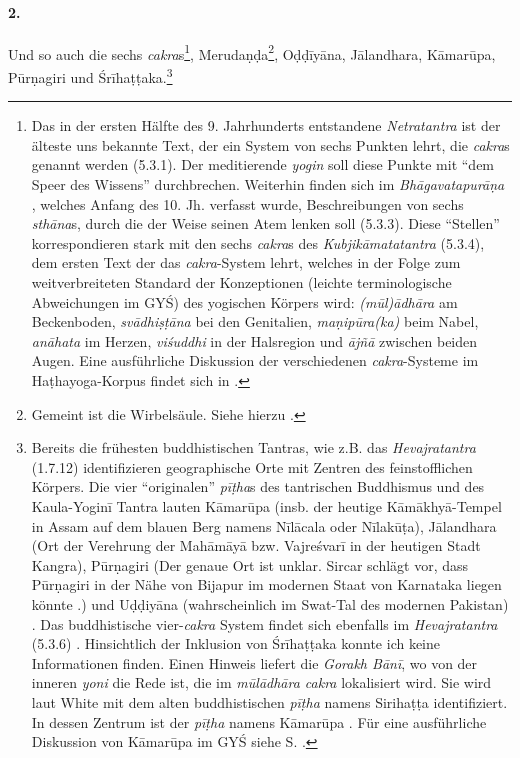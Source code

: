\documentclass[a4paper,12pt]{article}
\begin{document}
\label{cakras}
\paragraph{2.} Und so auch die sechs \textit{cakra}s\footnote{Das in der ersten Hälfte des 9. Jahrhunderts entstandene \textit{Netratantra} \parencite{netratantra} ist der älteste uns bekannte Text, der ein System von sechs Punkten lehrt, die \textit{cakra}s genannt werden (5.3.1). Der meditierende \textit{yogin} soll diese Punkte mit ``dem Speer des Wissens'' durchbrechen. Weiterhin finden sich im \textit{Bhāgavatapurāṇa} \parencite{bhagavata}, welches Anfang des 10. Jh. verfasst wurde, Beschreibungen von sechs \textit{sthāna}s, durch die der Weise seinen Atem lenken soll (5.3.3). Diese ``Stellen'' korrespondieren stark mit den sechs \textit{cakra}s des \textit{Kubjikāmatatantra} (5.3.4), dem ersten Text der das \textit{cakra}-System lehrt, welches in der Folge zum weitverbreiteten Standard der Konzeptionen (leichte terminologische Abweichungen im GYŚ) des yogischen Körpers wird: \textit{(mūl)ādhāra} am Beckenboden, \textit{svādhiṣṭāna} bei den Genitalien, \textit{maṇipūra(ka)} beim Nabel, \textit{anāhata} im Herzen, \textit{viśuddhi} in der Halsregion und \textit{ājñā} zwischen beiden Augen. Eine ausführliche Diskussion der verschiedenen \textit{cakra}-Systeme im Haṭhayoga-Korpus findet sich in \parencite[175-178, 203-213]{rootsofyoga2017}.}, Merudaṇḍa\footnote{Gemeint ist die Wirbelsäule. Siehe hierzu \parencite[260, 328]{white1996}.}, Oḍḍīyāna, Jālandhara, Kāmarūpa, Pūrṇagiri und Śrīhaṭṭaka.\footnote{Bereits die frühesten buddhistischen Tantras, wie z.B. das \textit{Hevajratantra} (1.7.12) \parencite{hevajra} identifizieren geographische Orte mit Zentren des feinstofflichen Körpers. Die vier ``originalen'' \textit{pīṭha}s des tantrischen Buddhismus und des Kaula-Yoginī Tantra lauten Kāmarūpa (insb. der heutige Kāmākhyā-Tempel in Assam auf dem blauen Berg namens Nīlācala oder Nīlakūṭa), Jālandhara (Ort der Verehrung der Mahāmāyā bzw. Vajreśvarī in der heutigen Stadt Kangra), Pūrṇagiri (Der genaue Ort ist unklar. Sircar schlägt vor, dass Pūrṇagiri in der Nähe von Bijapur im modernen Staat von Karnataka liegen könnte \parencite[14]{sircar}.) und Uḍḍiyāna (wahrscheinlich im Swat-Tal des modernen Pakistan) \parencite[31-37]{urban2010}. Das buddhistische vier-\textit{cakra} System findet sich ebenfalls im \textit{Hevajratantra} (5.3.6) \parencite[171]{rootsofyoga2017}. Hinsichtlich der Inklusion von Śrīhaṭṭaka konnte ich keine Informationen finden. Einen Hinweis liefert die \textit{Gorakh Bānī}, wo von der inneren \textit{yoni} die Rede ist, die im \textit{mūlādhāra cakra} lokalisiert wird. Sie wird laut White mit dem alten buddhistischen \textit{pīṭha} namens Sirihaṭṭa identifiziert. In dessen Zentrum ist der \textit{pīṭha} namens Kāmarūpa \parencite[485]{white1996}. Für eine ausführliche Diskussion von Kāmarūpa im GYŚ siehe S. \pageref{kamarupa}.}  
\end{document}
